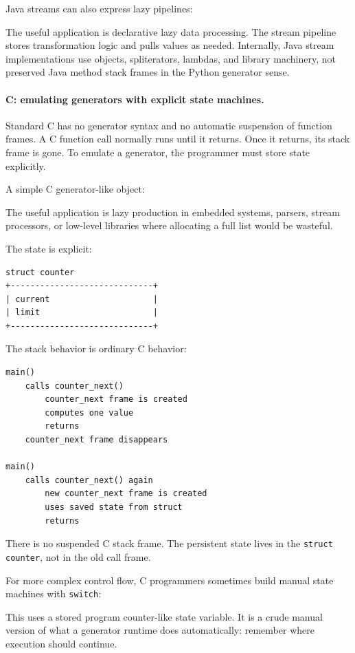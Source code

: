 Java streams can also express lazy pipelines:

The useful application is declarative lazy data processing. The stream pipeline stores transformation logic and pulls values as needed. Internally, Java stream implementations use objects, spliterators, lambdas, and library machinery, not preserved Java method stack frames in the Python generator sense.

\paragraph{C: emulating generators with explicit state machines.}

Standard C has no generator syntax and no automatic suspension of function frames. A C function call normally runs until it returns. Once it returns, its stack frame is gone. To emulate a generator, the programmer must store state explicitly.

A simple C generator-like object:

The useful application is lazy production in embedded systems, parsers, stream processors, or low-level libraries where allocating a full list would be wasteful.

The state is explicit:

\begin{verbatim}
struct counter
+-----------------------------+
| current                     |
| limit                       |
+-----------------------------+
\end{verbatim}

The stack behavior is ordinary C behavior:

\begin{verbatim}
main()
    calls counter_next()
        counter_next frame is created
        computes one value
        returns
    counter_next frame disappears

main()
    calls counter_next() again
        new counter_next frame is created
        uses saved state from struct
        returns
\end{verbatim}

There is no suspended C stack frame. The persistent state lives in the \texttt{struct counter}, not in the old call frame.

For more complex control flow, C programmers sometimes build manual state machines with \texttt{switch}:

This uses a stored program counter-like state variable. It is a crude manual version of what a generator runtime does automatically: remember where execution should continue.

